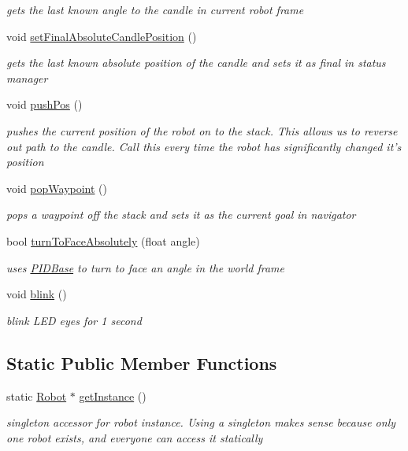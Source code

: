 \begin{DoxyCompactItemize}
\begin{DoxyCompactList}\small\item\em gets the last known angle to the candle in current robot frame \end{DoxyCompactList}\item 
void \hyperlink{classRobot_a0041769ee864f2952fab05db433e20ea}{set\-Final\-Absolute\-Candle\-Position} ()
\begin{DoxyCompactList}\small\item\em gets the last known absolute position of the candle and sets it as final in status manager \end{DoxyCompactList}\item 
void \hyperlink{classRobot_abec1c3c25468c64565a4e1c934f32d62}{push\-Pos} ()
\begin{DoxyCompactList}\small\item\em pushes the current position of the robot on to the stack. This allows us to reverse out path to the candle. Call this every time the robot has significantly changed it's position \end{DoxyCompactList}\item 
void \hyperlink{classRobot_a7e05e17417f58dd3b9d3d02b365a5df1}{pop\-Waypoint} ()
\begin{DoxyCompactList}\small\item\em pops a waypoint off the stack and sets it as the current goal in navigator \end{DoxyCompactList}\item 
bool \hyperlink{classRobot_a485de0486179cbbdc32561fd87bfe1c2}{turn\-To\-Face\-Absolutely} (float angle)
\begin{DoxyCompactList}\small\item\em uses \hyperlink{classPIDBase}{P\-I\-D\-Base} to turn to face an angle in the world frame \end{DoxyCompactList}\item 
void \hyperlink{classRobot_a25b097fc694c1ce0fc7f847339050afa}{blink} ()
\begin{DoxyCompactList}\small\item\em blink L\-E\-D eyes for 1 second \end{DoxyCompactList}\end{DoxyCompactItemize}
\subsection*{Static Public Member Functions}
\begin{DoxyCompactItemize}
\item 
static \hyperlink{classRobot}{Robot} $\ast$ \hyperlink{classRobot_ac6f19dc31b435f8a2d43944ba49286d0}{get\-Instance} ()
\begin{DoxyCompactList}\small\item\em singleton accessor for robot instance. Using a singleton makes sense because only one robot exists, and everyone can access it statically \end{DoxyCompactList}\end{DoxyCompactItemize}
